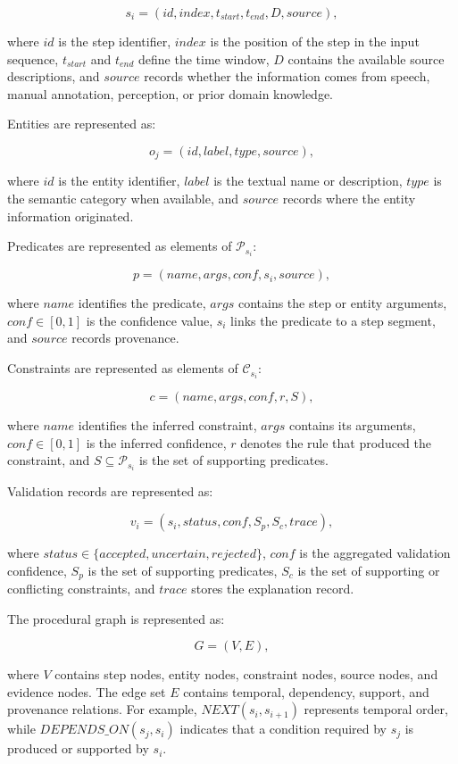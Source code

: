 \[
s_i = (id, index, t_{start}, t_{end}, D, source),
\]

where $id$ is the step identifier, $index$ is the position of the step in the input sequence, $t_{start}$ and $t_{end}$ define the time window, $D$ contains the available source descriptions, and $source$ records whether the information comes from speech, manual annotation, perception, or prior domain knowledge.

Entities are represented as:

\[
o_j = (id, label, type, source),
\]

where $id$ is the entity identifier, $label$ is the textual name or description, $type$ is the semantic category when available, and $source$ records where the entity information originated.

Predicates are represented as elements of $\mathcal{P}_{s_i}$:

\[
p = (name, args, conf, s_i, source),
\]

where $name$ identifies the predicate, $args$ contains the step or entity arguments, $conf \in [0,1]$ is the confidence value, $s_i$ links the predicate to a step segment, and $source$ records provenance.

Constraints are represented as elements of $\mathcal{C}_{s_i}$:

\[
c = (name, args, conf, r, S),
\]

where $name$ identifies the inferred constraint, $args$ contains its arguments, $conf \in [0,1]$ is the inferred confidence, $r$ denotes the rule that produced the constraint, and $S \subseteq \mathcal{P}_{s_i}$ is the set of supporting predicates.

Validation records are represented as:

\[
v_i = (s_i, status, conf, S_p, S_c, trace),
\]

where $status \in \{accepted, uncertain, rejected\}$, $conf$ is the aggregated validation confidence, $S_p$ is the set of supporting predicates, $S_c$ is the set of supporting or conflicting constraints, and $trace$ stores the explanation record.

The procedural graph is represented as:

\[
G = (V,E),
\]

where $V$ contains step nodes, entity nodes, constraint nodes, source nodes, and evidence nodes. The edge set $E$ contains temporal, dependency, support, and provenance relations. For example, $NEXT(s_i,s_{i+1})$ represents temporal order, while $DEPENDS\_ON(s_j,s_i)$ indicates that a condition required by $s_j$ is produced or supported by $s_i$.

